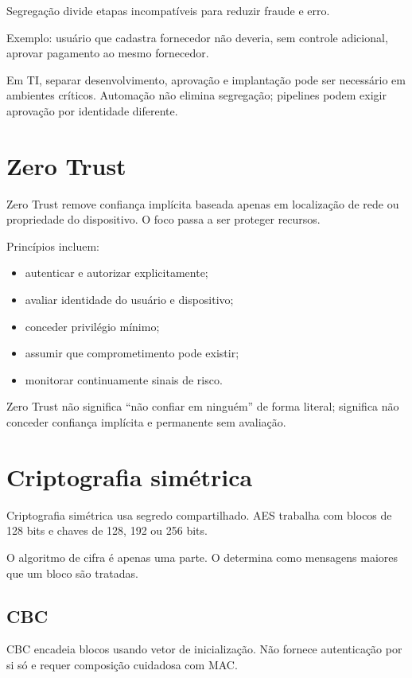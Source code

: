 Segregação divide etapas incompatíveis para reduzir fraude e erro.

Exemplo: usuário que cadastra fornecedor não deveria, sem controle adicional, aprovar pagamento ao mesmo fornecedor.

Em TI, separar desenvolvimento, aprovação e implantação pode ser necessário em ambientes críticos. Automação não elimina segregação; pipelines podem exigir aprovação por identidade diferente.

\section{Zero Trust}

Zero Trust remove confiança implícita baseada apenas em localização de rede ou propriedade do dispositivo. O foco passa a ser proteger recursos.

Princípios incluem:
\begin{itemize}
\item autenticar e autorizar explicitamente;
\item avaliar identidade do usuário e dispositivo;
\item conceder privilégio mínimo;
\item assumir que comprometimento pode existir;
\item monitorar continuamente sinais de risco.
\end{itemize}

Zero Trust não significa ``não confiar em ninguém'' de forma literal; significa não conceder confiança implícita e permanente sem avaliação.

\section{Criptografia simétrica}

Criptografia simétrica usa segredo compartilhado. AES trabalha com blocos de 128 bits e chaves de 128, 192 ou 256 bits.

O algoritmo de cifra é apenas uma parte. O  determina como mensagens maiores que um bloco são tratadas.

\subsection{CBC}

CBC encadeia blocos usando vetor de inicialização. Não fornece autenticação por si só e requer composição cuidadosa com MAC.

